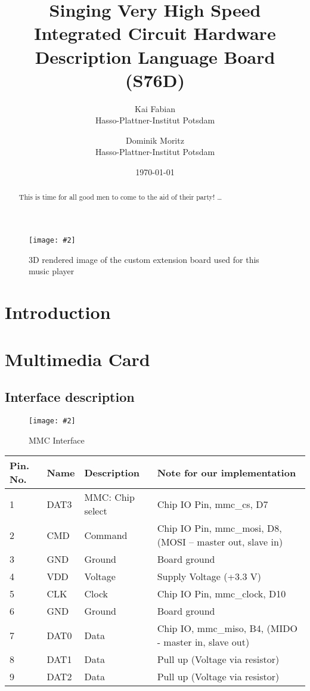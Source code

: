 \documentclass[12pt, a4paper]{article}
\title{Singing Very High Speed Integrated Circuit Hardware Description Language Board (S76D)}
\author{
        Kai Fabian \\
        Hasso-Plattner-Institut Potsdam\\
            \and
        Dominik Moritz \\
        Hasso-Plattner-Institut Potsdam\\
}
\date{\today}
\newcommand{\image}[5]{
	\begin{figure}[#4]               %
		\centering                     %
		\texttt{[image: \#2]} %
		\caption{#3}                   %
		\label{fig:#5}                 %
	\end{figure}                     %
}
\begin{document}
\maketitle

\image{0.7\textwidth}{render.png}{3D rendered image of the custom extension board used for this music player}{ht}{render}

\begin{abstract}
This is time for all good men to come to the aid of their party! \ldots
\end{abstract}

\tableofcontents

\section{Introduction}

\section{Multimedia Card}

\subsection{Interface description}

\image{0.3\textwidth}{../mmc_pins.png}{MMC Interface}{ht}{interface}

\begin{table}
    \begin{tabular}{|l|l|l|p{8cm}|}
    \hline
Pin. No.   & Name    & Description	    & Note for our implementation \\ \hline
1	       & DAT3	 & MMC: Chip select & Chip IO Pin, mmc\_cs, D7 \\
2	       & CMD	 & Command 	        & Chip IO Pin,  mmc\_mosi, D8, (MOSI – master out, slave in) \\
3	       & GND	 & Ground	        & Board ground \\
4	       & VDD	 & Voltage	        & Supply Voltage (+3.3 V) \\
5	       & CLK	 & Clock	        & Chip IO Pin,  mmc\_clock, D10 \\
6	       & GND	 & Ground	        & Board ground \\
7	       & DAT0	 & Data	            & Chip IO,  mmc\_miso, B4, (MIDO - master in, slave out) \\
8	       & DAT1	 & Data	            & Pull up (Voltage via resistor) \\
9	       & DAT2	 & Data	            & Pull up (Voltage via resistor) \\
	\hline
    \end{tabular}
\end{table}
\end{document}
